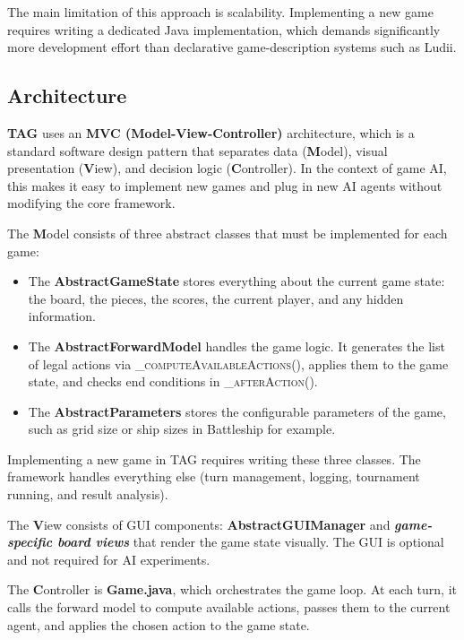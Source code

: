 The main limitation of this approach is scalability. Implementing a new game requires writing a dedicated Java implementation, which demands significantly more development effort than declarative game-description systems such as Ludii.

\subsection{Architecture}
\textbf{TAG} uses an \textbf{MVC (Model-View-Controller)} architecture, which is a standard software design pattern that separates data (\textbf{M}odel), visual presentation (\textbf{V}iew), and decision logic (\textbf{C}ontroller). 
In the context of game AI, this makes it easy to implement new games and plug in new AI agents without modifying the core framework.



The \textbf{M}odel consists of three abstract classes that must be implemented for each game:
\begin{itemize}
    \item The \textbf{AbstractGameState} stores everything about the current game state: the board, the pieces, the scores, the current player, and any hidden information.

    \item The \textbf{AbstractForwardModel} handles the game logic. It generates the list of legal actions via \textsc{\_computeAvailableActions()}, applies them to the game state, and checks end conditions in \textsc{\_afterAction()}.

    \item The \textbf{AbstractParameters} stores the configurable parameters of the game, such as grid size or ship sizes in Battleship for example.
\end{itemize}
Implementing a new game in TAG requires writing these three classes. The framework handles everything else (turn management, logging, tournament running, and result analysis).

\medskip

The \textbf{V}iew consists of GUI components: \textbf{AbstractGUIManager} and \textbf{\textit{game-specific board views}} that render the game state visually. The GUI is optional and not required for AI experiments. 

\medskip

The \textbf{C}ontroller is \textbf{Game.java}, which orchestrates the game loop. At each turn, it calls the forward model to compute available actions, passes them to the current agent, and applies the chosen action to the game state.

